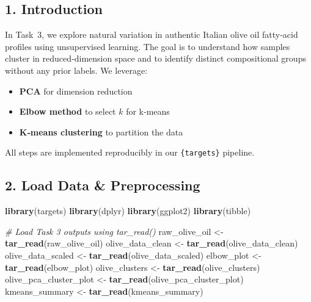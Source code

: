 \documentclass[
]{article}
\newenvironment{Shaded}{\begin{snugshade}}{\end{snugshade}}
\newcommand{\CommentTok}[1]{\textcolor[rgb]{0.56,0.35,0.01}{\textit{#1}}}
\newcommand{\FunctionTok}[1]{\textcolor[rgb]{0.13,0.29,0.53}{\textbf{#1}}}
\newcommand{\NormalTok}[1]{#1}
\newcommand{\OtherTok}[1]{\textcolor[rgb]{0.56,0.35,0.01}{#1}}
\providecommand{\tightlist}{%
  \setlength{\itemsep}{0pt}\setlength{\parskip}{0pt}}
\begin{document}
\subsection{1. Introduction}\label{introduction-2}

In Task~3, we explore natural variation in authentic Italian olive oil
fatty‐acid profiles using unsupervised learning. The goal is to
understand how samples cluster in reduced‐dimension space and to
identify distinct compositional groups without any prior labels. We
leverage:

\begin{itemize}
\tightlist
\item
  \textbf{PCA} for dimension reduction\\
\item
  \textbf{Elbow method} to select \(k\) for k‑means\\
\item
  \textbf{K‑means clustering} to partition the data
\end{itemize}

All steps are implemented reproducibly in our \texttt{\{targets\}}
pipeline.

\subsection{2. Load Data \&
Preprocessing}\label{load-data-preprocessing}

\begin{Shaded}
\begin{Highlighting}[]
\FunctionTok{library}\NormalTok{(targets)}
\FunctionTok{library}\NormalTok{(dplyr)}
\FunctionTok{library}\NormalTok{(ggplot2)}
\FunctionTok{library}\NormalTok{(tibble)}

\CommentTok{\# Load Task 3 outputs using tar\_read()}
\NormalTok{raw\_olive\_oil           }\OtherTok{\textless{}{-}} \FunctionTok{tar\_read}\NormalTok{(raw\_olive\_oil)}
\NormalTok{olive\_data\_clean        }\OtherTok{\textless{}{-}} \FunctionTok{tar\_read}\NormalTok{(olive\_data\_clean)}
\NormalTok{olive\_data\_scaled       }\OtherTok{\textless{}{-}} \FunctionTok{tar\_read}\NormalTok{(olive\_data\_scaled)}
\NormalTok{elbow\_plot              }\OtherTok{\textless{}{-}} \FunctionTok{tar\_read}\NormalTok{(elbow\_plot)}
\NormalTok{olive\_clusters          }\OtherTok{\textless{}{-}} \FunctionTok{tar\_read}\NormalTok{(olive\_clusters)}
\NormalTok{olive\_pca\_cluster\_plot  }\OtherTok{\textless{}{-}} \FunctionTok{tar\_read}\NormalTok{(olive\_pca\_cluster\_plot)}
\NormalTok{kmeans\_summary          }\OtherTok{\textless{}{-}} \FunctionTok{tar\_read}\NormalTok{(kmeans\_summary)}
\end{Highlighting}
\end{Shaded}
\end{document}
